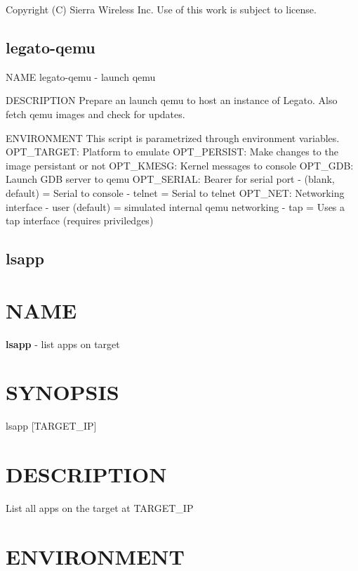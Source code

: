  Copyright (C) Sierra Wireless Inc. Use of this work is subject to license. \hypertarget{toolsHost_legato-qemu}{}\subsection{legato-\/qemu}\label{toolsHost_legato-qemu}
\begin{DoxyVerb}NAME
    legato-qemu - launch qemu

DESCRIPTION
    Prepare an launch qemu to host an instance of Legato.
    Also fetch qemu images and check for updates.

ENVIRONMENT
    This script is parametrized through environment variables.
        OPT_TARGET: Platform to emulate
        OPT_PERSIST: Make changes to the image persistant or not
        OPT_KMESG: Kernel messages to console
        OPT_GDB: Launch GDB server to qemu
        OPT_SERIAL: Bearer for serial port
                    - (blank, default) = Serial to console
                    - telnet = Serial to telnet
        OPT_NET: Networking interface
                 - user (default) = simulated internal qemu networking
                 - tap = Uses a tap interface (requires priviledges)
\end{DoxyVerb}
 \hypertarget{toolsHost_lsapp}{}\subsection{lsapp}\label{toolsHost_lsapp}
\section*{N\+A\+M\+E}

{\bfseries lsapp} -\/ list apps on target

\section*{S\+Y\+N\+O\+P\+S\+I\+S}

{\ttfamily lsapp \mbox{[}T\+A\+R\+G\+E\+T\+\_\+\+I\+P\mbox{]}}~\newline


\section*{D\+E\+S\+C\+R\+I\+P\+T\+I\+O\+N}

List all apps on the target at T\+A\+R\+G\+E\+T\+\_\+\+I\+P

\section*{E\+N\+V\+I\+R\+O\+N\+M\+E\+N\+T}

